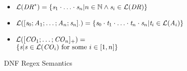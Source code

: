 \begin{figure}
\begin{itemize}
\item $\mathcal{L}(\mathit{DR}^*) =
\{\mathit{s}_1\cdot\ldots\cdot\mathit{s}_n | n\in\mathbb{N} \wedge \mathit{s}_i\in\mathcal{L}(\mathit{DR})\}$
\item $\mathcal{L}([\mathit{s}_0;\mathit{A}_1;\ldots;\mathit{A}_n;\mathit{s}_n]_{\cdot})=
\{\mathit{s}_0\cdot\mathit{t}_1\cdot\ldots\cdot\mathit{t}_n\cdot\mathit{s}_n | \mathit{t}_i\in\mathcal{L}(\mathit{A}_i)\}$
\item $\mathcal{L}([\mathit{CO}_1;\ldots;\mathit{CO}_n]_{+})=$\\
\hspace*{.5em}$\{\mathit{s} | \mathit{s} \in \mathcal{L}(\mathit{CO}_i) \text{ for some $i\in[1,n]$}\}$
\end{itemize}
\caption{DNF Regex Semantics}
\label{fig:dnf-regex-semantics}
\end{figure}
